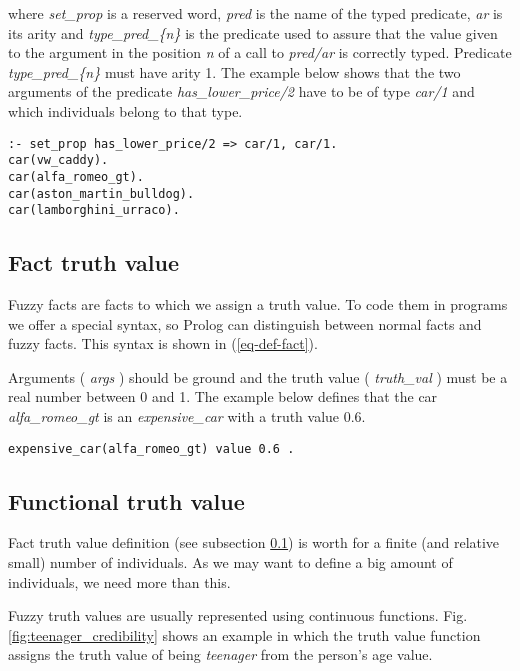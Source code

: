 \documentclass[runningheads,a4paper]{llncs}
\begin{document}
where {\it set\_prop} is a reserved word, {\it pred} is the name
of the typed predicate, {\it ar} is its arity and
{\it type\_pred\_\{n\}} is the predicate used to assure that the
value given to the argument in the position {\it n} of a call to
{\it pred/ar} is correctly typed. 
Predicate {\it type\_pred\_\{n\}} must have arity 1.  
The example below shows that the two arguments of the predicate
{\it has\_lower\_price/2} have to be of type {\it car/1} and
which individuals belong to that type.

\begin{verbatim}
:- set_prop has_lower_price/2 => car/1, car/1.
car(vw_caddy).
car(alfa_romeo_gt).
car(aston_martin_bulldog).
car(lamborghini_urraco).
\end{verbatim}


\subsection{Fact truth value}
\label{fact-truth-value}

Fuzzy facts are facts to which we assign a truth value. 
To code them in programs we offer a special syntax, so Prolog 
can distinguish between normal facts and fuzzy facts.
This syntax is shown in (\ref{eq-def-fact}).

 
Arguments ( {\it args} ) should be ground and the truth value ( {\it
truth\_val} ) must be a real number between 0 and 1.  The example 
below defines that the car {\it
alfa\_romeo\_gt} is an {\it expensive\_car} with a truth value 0.6.

\begin{verbatim}
expensive_car(alfa_romeo_gt) value 0.6 .
\end{verbatim}

\subsection{Functional truth value}
\label{functional-truth-value}

Fact truth value definition (see subsection \ref{fact-truth-value}) 
is worth for a finite (and relative small) number of individuals.
As we may want to define a big amount of individuals, we need
more than this.

Fuzzy truth values are usually represented using continuous
functions. 
Fig. \ref{fig:teenager_credibility} shows an example in which 
the truth value function assigns the truth value of being 
{\it teenager} from the person's age value.
\end{document}
